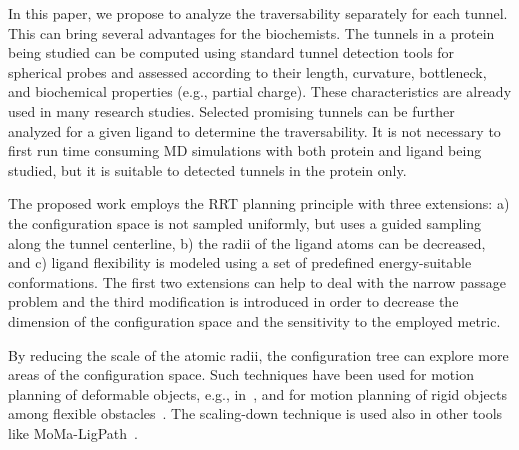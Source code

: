 \documentclass{svmult}
\begin{document}
In this paper, we propose to analyze the traversability separately for each tunnel.
This can bring several advantages for the biochemists.
The tunnels in a protein being studied can be computed using standard tunnel detection tools for spherical probes and assessed
according to their length, curvature, bottleneck, and biochemical properties (e.g., partial charge).
These characteristics are already used in many research studies.
Selected promising tunnels can be further analyzed for a given ligand to determine the traversability.
It is not necessary to first run time consuming MD simulations with both protein and ligand being studied, but it is suitable
to detected tunnels in the protein only.

The proposed work employs the RRT planning principle with three extensions: 
a) the configuration space is not sampled uniformly, but uses a guided sampling along the tunnel centerline,
b) the radii of the ligand atoms can be decreased, and 
c) ligand flexibility is modeled using a set of predefined energy-suitable conformations.
The first two extensions can help to deal with the narrow passage problem and the third modification
is introduced in order to decrease the dimension of the configuration space and the sensitivity to the employed
metric.

By reducing the scale of the atomic radii, the configuration tree can explore more areas of the configuration space.
Such techniques have been used for motion planning of deformable objects, 
e.g., in~\cite{frank2008efficient,bayazit2001ligand,alterovitz2008motion,lamiraux2001flexible,kavraki1998towards,gayle2005path}, 
and for motion planning of rigid objects among 
flexible obstacles~\cite{rodriguez2006planning,frank2008efficient,phillips2014representation}.
The scaling-down technique is used also in other tools like MoMa-LigPath~\cite{cortes2005path}.
\end{document}

